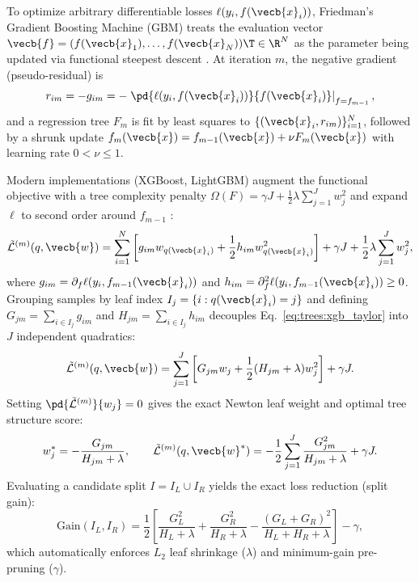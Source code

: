 \documentclass[../../../../master.tex]{subfiles}
\begin{document}
To optimize arbitrary differentiable losses $\ell(y_i, f(\vecb{x}_i))$, Friedman's Gradient Boosting Machine (GBM) treats the evaluation vector $\vecb{f} = (f(\vecb{x}_1), \dots, f(\vecb{x}_N))\T \in \R^N$ as the parameter being updated via functional steepest descent . At iteration $m$, the negative gradient (pseudo-residual) is
\begin{equation}
  r_{im} = -g_{im} = -\left.\pd{\ell(y_i, f(\vecb{x}_i))}{f(\vecb{x}_i)}\right|_{f = f_{m-1}},
  \label{eq:trees:pseudo_residual}
\end{equation}
and a regression tree $F_m$ is fit by least squares to $\{(\vecb{x}_i, r_{im})\}_{i=1}^{N}$, followed by a shrunk update $f_m(\vecb{x}) = f_{m-1}(\vecb{x}) + \nu F_m(\vecb{x})$ with learning rate $0 < \nu \le 1$.

\begin{coremath}
Modern implementations (XGBoost, LightGBM) augment the functional objective with a tree complexity penalty $\Omega(F) = \gamma J + \frac{1}{2}\lambda \sum_{j=1}^{J} w_j^2$ and expand $\ell$ to second order around $f_{m-1}$ :
\begin{equation}
  \tilde{\mathcal{L}}^{(m)}(q, \vecb{w}) = \sum_{i=1}^{N} \left[g_{im} w_{q(\vecb{x}_i)} + \frac{1}{2} h_{im} w_{q(\vecb{x}_i)}^2\right] + \gamma J + \frac{1}{2}\lambda \sum_{j=1}^{J} w_j^2,
  \label{eq:trees:xgb_taylor}
\end{equation}
where $g_{im} = \partial_{f}\ell(y_i, f_{m-1}(\vecb{x}_i))$ and $h_{im} = \partial_{f}^2\ell(y_i, f_{m-1}(\vecb{x}_i)) \ge 0$. Grouping samples by leaf index $I_j = \{i : q(\vecb{x}_i) = j\}$ and defining $G_{jm} = \sum_{i \in I_j} g_{im}$ and $H_{jm} = \sum_{i \in I_j} h_{im}$ decouples Eq.~\eqref{eq:trees:xgb_taylor} into $J$ independent quadratics:
\begin{equation}
  \tilde{\mathcal{L}}^{(m)}(q, \vecb{w}) = \sum_{j=1}^{J} \left[G_{jm} w_j + \frac{1}{2}(H_{jm} + \lambda) w_j^2\right] + \gamma J.
  \label{eq:trees:xgb_leaf_sum}
\end{equation}
Setting $\pd{\tilde{\mathcal{L}}^{(m)}}{w_j} = 0$ gives the exact Newton leaf weight and optimal tree structure score:
\begin{equation}
  w_j^* = -\frac{G_{jm}}{H_{jm} + \lambda}, \qquad
  \tilde{\mathcal{L}}^{(m)}(q, \vecb{w}^*) = -\frac{1}{2}\sum_{j=1}^{J}\frac{G_{jm}^2}{H_{jm} + \lambda} + \gamma J.
  \label{eq:trees:xgb_opt_leaf}
\end{equation}
Evaluating a candidate split $I = I_L \cup I_R$ yields the exact loss reduction (split gain):
\begin{equation}
  \mathrm{Gain}(I_L, I_R) = \frac{1}{2}\left[\frac{G_L^2}{H_L + \lambda} + \frac{G_R^2}{H_R + \lambda} - \frac{(G_L + G_R)^2}{H_L + H_R + \lambda}\right] - \gamma,
  \label{eq:trees:xgb_gain}
\end{equation}
which automatically enforces $L_2$ leaf shrinkage ($\lambda$) and minimum-gain pre-pruning ($\gamma$).
\end{coremath}
\end{document}
